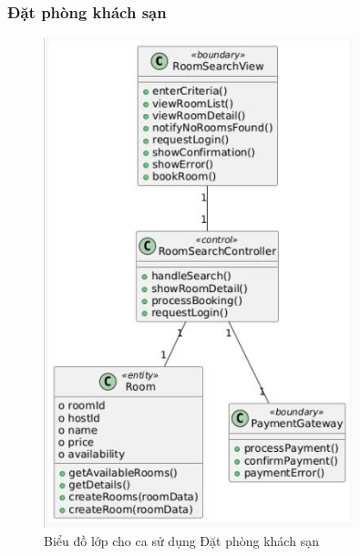 \subsubsection{Đặt phòng khách sạn}
\begin{figure}[H]
    \centering
    \includegraphics[width=0.8\textwidth]{img2.2/tim.jpg}
    \caption{Biểu đồ lớp cho ca sử dụng Đặt phòng khách sạn}
\end{figure}

